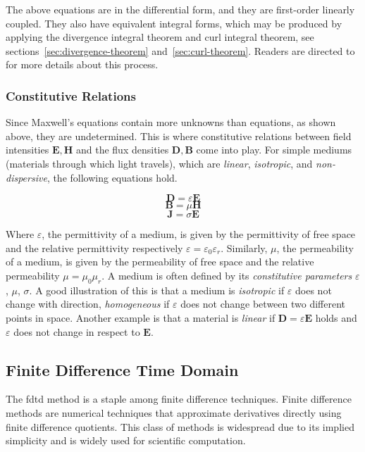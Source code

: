The above equations are in the differential form, and they are first-order linearly coupled. They also have equivalent integral forms, which may be produced by applying the divergence integral theorem and curl integral theorem, see sections~\ref{sec:divergence-theorem} and~\ref{sec:curl-theorem}. Readers are directed to~\cite[Chapter~2.4]{staelin2009electromagnetics} for more details about this process.



\subsubsection*{Constitutive Relations}
Since Maxwell's equations contain more unknowns than equations, as shown above, they are undetermined. This is where constitutive relations between field intensities $\mathbf{E},\mathbf{H}$ and the flux densities $\mathbf{D},\mathbf{B}$ come into play. 
For simple mediums (materials through which light travels), which are \emph{linear}, \emph{isotropic}, and \emph{non-dispersive}, the following equations hold.


\begin{equation}
\mathbf{D} = \varepsilon \mathbf{E}
\end{equation}
\begin{equation}
\mathbf{B} = \mu \mathbf{H}
\end{equation}
\begin{equation}
\mathbf{J} = \sigma \mathbf{E}
\end{equation}

Where $\varepsilon$, the permittivity of a medium, is given by the permittivity of free space and the relative permittivity respectively $\varepsilon = \varepsilon_0\varepsilon_r$. Similarly, $\mu$, the permeability of a medium, is given by the permeability of free space and the relative permeability $\mu = \mu_0\mu_r$. A medium is often defined by its \emph{constitutive parameters} $\varepsilon$, $\mu$, $\sigma$. A good illustration of this is that a medium is \emph{isotropic} if $\varepsilon$ does not change with direction, \emph{homogeneous} if $\varepsilon$ does not change between two different points in space. Another example is that a material is \emph{linear} if $\mathbf{D} = \varepsilon \mathbf{E}$ holds and $\varepsilon$ does not change in respect to $\mathbf{E}$.





\subsection{Finite Difference Time Domain}
The \gls{fdtd} method is a staple among finite difference techniques. Finite difference methods are numerical techniques that approximate derivatives directly using finite difference quotients. This class of methods is widespread due to its implied simplicity and is widely used for scientific computation. 


